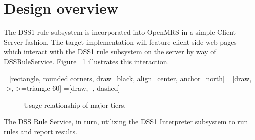 \documentclass[12pt,letterpaper]{article}
\begin{document}
\newpage 
\section{Design overview} \label{sec:DESIGN_OVERVIEW}

	The DSS1 rule subsystem is incorporated into OpenMRS in a simple Client-Server fashion. The target implementation will feature client-side web pages which interact with the DSS1 rule subsystem on the server by way of DSSRuleService. Figure ~\ref{fig:TIERS} illustrates this interaction.

=[rectangle, 
                   rounded corners,
                   draw=black, 
                   align=center,
                   anchor=north]
=[draw, ->, >=triangle 60]
=[draw, -, dashed]
\begin{figure}\begin{center}
\caption{Usage relationship of major tiers.}\label{fig:TIERS}
\end{center}\end{figure}

The DSS Rule Service, in turn, utilizing the DSS1 Interpreter subsystem to run rules and report results.
\end{document}
